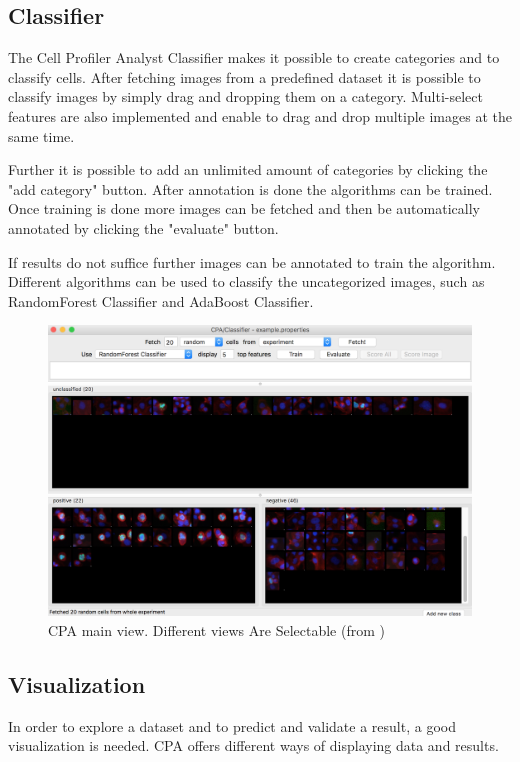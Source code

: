 \subsection{Classifier}
The Cell Profiler Analyst Classifier makes it possible to create categories and to classify cells.
 After fetching images from a predefined dataset it is possible to classify images 
 by simply drag and dropping them on a category. Multi-select features are also implemented
  and enable to drag and drop multiple images at the same time. 
  
  Further it is possible to add an unlimited amount of categories by clicking the "add category" button. 
  After annotation is done the algorithms can be trained. Once training is done more images can be 
  fetched and then be automatically annotated by clicking the "evaluate" button. 
  
  If results do not suffice further images can be annotated to train the algorithm. 
  Different algorithms can be used to classify the uncategorized images, such as 
  RandomForest Classifier and AdaBoost Classifier.

\begin{figure}[H]
	\centering
	\includegraphics[width=1.0\linewidth]{bilder/related_work/classifier.png}
	\caption{CPA main view. Different views Are Selectable (from \cite{Jones2008})}
	\label{fig:Classifier}
\end{figure}


\subsection{Visualization}


In order to explore a dataset and to predict and validate a result, a good visualization is needed. 
CPA offers different ways of displaying data and results. 

